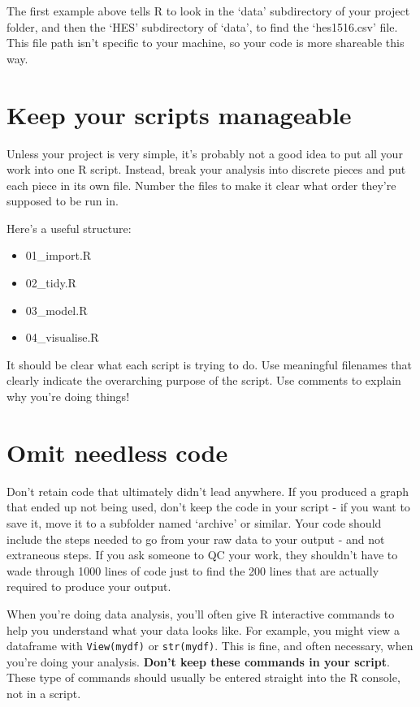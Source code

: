 \documentclass[]{book}
\providecommand{\tightlist}{%
  \setlength{\itemsep}{0pt}\setlength{\parskip}{0pt}}
\begin{document}
The first example above tells R to look in the `data' subdirectory of your project folder, and then the `HES' subdirectory of `data', to find the `hes1516.csv' file. This file path isn't specific to your machine, so your code is more shareable this way.

\hypertarget{manageable}{%
\section{Keep your scripts manageable}\label{manageable}}

Unless your project is very simple, it's probably not a good idea to put all your work into one R script. Instead, break your analysis into discrete pieces and put each piece in its own file. Number the files to make it clear what order they're supposed to be run in.

Here's a useful structure:

\begin{itemize}
\tightlist
\item
  01\_import.R
\item
  02\_tidy.R
\item
  03\_model.R
\item
  04\_visualise.R
\end{itemize}

It should be clear what each script is trying to do. Use meaningful filenames that clearly indicate the overarching purpose of the script. Use comments to explain why you're doing things!

\hypertarget{omit-needless-code}{%
\section{Omit needless code}\label{omit-needless-code}}

Don't retain code that ultimately didn't lead anywhere. If you produced a graph that ended up not being used, don't keep the code in your script - if you want to save it, move it to a subfolder named `archive' or similar. Your code should include the steps needed to go from your raw data to your output - and not extraneous steps. If you ask someone to QC your work, they shouldn't have to wade through 1000 lines of code just to find the 200 lines that are actually required to produce your output.

When you're doing data analysis, you'll often give R interactive commands to help you understand what your data looks like. For example, you might view a dataframe with \texttt{View(mydf)} or \texttt{str(mydf)}. This is fine, and often necessary, when you're doing your analysis. \textbf{Don't keep these commands in your script}. These type of commands should usually be entered straight into the R console, not in a script.
\end{document}
